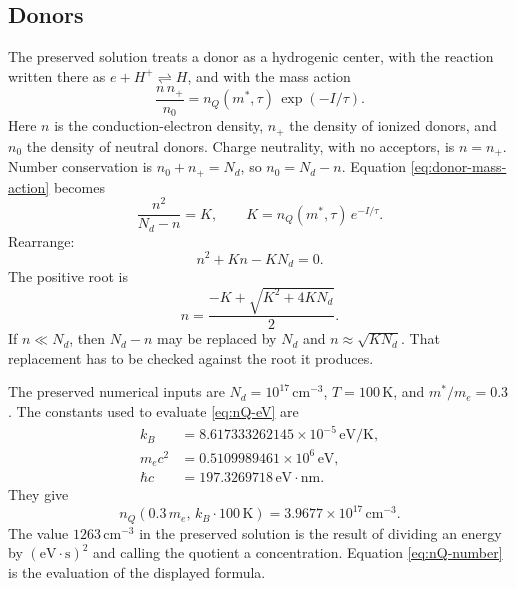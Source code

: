\subsection{Donors}

The preserved solution treats a donor as a hydrogenic center, with the reaction written there as \(e + H^{+} \rightleftharpoons H\), and with the mass action
\begin{equation}
\label{eq:donor-mass-action}
\frac{n\, n_{+}}{n_{0}} = n_Q(m^{\!*},\tau)\, \exp(-I/\tau).
\end{equation}
Here \(n\) is the conduction-electron density, \(n_{+}\) the density of ionized donors, and \(n_{0}\) the density of neutral donors. Charge neutrality, with no acceptors, is \(n = n_{+}\). Number conservation is \(n_{0} + n_{+} = N_d\), so \(n_{0} = N_d - n\). Equation \eqref{eq:donor-mass-action} becomes
\begin{equation}
\label{eq:donor-quadratic-setup}
\frac{n^2}{N_d - n} = K,
\qquad
K = n_Q(m^{\!*},\tau)\, e^{-I/\tau}.
\end{equation}
Rearrange:
\begin{equation}
\label{eq:donor-quadratic}
n^2 + K n - K N_d = 0.
\end{equation}
The positive root is
\begin{equation}
\label{eq:donor-root}
n = \frac{ -K + \sqrt{K^2 + 4 K N_d} }{2}.
\end{equation}
If \(n\ll N_d\), then \(N_d - n\) may be replaced by \(N_d\) and \(n \approx \sqrt{K N_d}\). That replacement has to be checked against the root it produces.

The preserved numerical inputs are \(N_d = 10^{17}\,\mathrm{cm}^{-3}\), \(T = 100\,\mathrm{K}\), and \(m^{\!*}/m_e = 0.3\). The constants used to evaluate \eqref{eq:nQ-eV} are
\begin{align}
k_B &= 8.617333262145\times 10^{-5}\,\mathrm{eV}/\mathrm{K}, \nonumber\\
m_e c^2 &= 0.5109989461\times 10^{6}\,\mathrm{eV}, \nonumber\\
\hbar c &= 197.3269718\,\mathrm{eV}\cdot\mathrm{nm}.
\label{eq:constants-donor}
\end{align}
They give
\begin{equation}
\label{eq:nQ-number}
n_Q(0.3\, m_e,\, k_B\cdot 100\,\mathrm{K})
= 3.9677\times 10^{17}\,\mathrm{cm}^{-3}.
\end{equation}
The value \(1263\,\mathrm{cm}^{-3}\) in the preserved solution is the result of dividing an energy by \((\mathrm{eV}\cdot\mathrm{s})^2\) and calling the quotient a concentration. Equation \eqref{eq:nQ-number} is the evaluation of the displayed formula.

